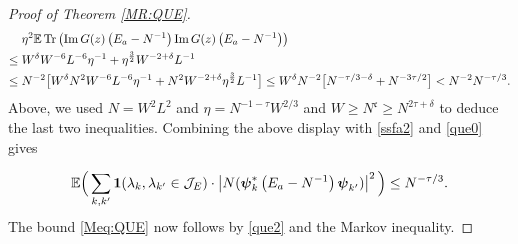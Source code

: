 \begin{proof}[Proof of Theorem \ref{MR:QUE}]
{\begin{align*}
    \;& \eta^2 \mathbb{E}  \operatorname{Tr} \left(\operatorname{Im} G(z)\left(E_a-N^{-1}\right) \operatorname{Im} G(z)\left(E_a-N^{-1}\right)\right)
 \\
 \le \;&   W^{\delta}W^{-6}L^{-6}\eta^{-1}+{\eta^{\frac32}W^{-2+\delta}}L^{-1}\\\nonumber
\le \;&    N^{-2} \big [ W^{\delta}{N^{2}W^{-6}L^{-6}\eta^{-1}}  +  {N^{2}W^{-2+\delta}\eta^{\frac32}L^{-1}}  \big ] \leq   W^{\delta} N^{-2} \big [ N^{-\tau/3-\delta}  + N^{-3\tau/2}  \big ] 
<   N^{-2}  N^{-\tau/3}.
\end{align*}
Above, we used $N=W^{2}L^{2}$ and $\eta=N^{-1-\tau}W^{2/3}$ and $W\geq N^{\mathfrak{c}}\geq N^{2\tau+\delta}$ to deduce the last two inequalities. Combining the above display with \eqref{ssfa2} and \eqref{que0} gives

\begin{align}\label{que2}
 \mathbb{E}\Big(\sum_{k,k'} \textbf{1}(\lambda_{k},\lambda_{k'}\in {\cal J}_E)\cdot \left|N(\boldsymbol{\psi}_{k}^*\left(E_a-N^{-1}\right) \boldsymbol{\psi}_{k'})\right|^2\Big)
 \le N^{-\tau/3}.
\end{align}
The bound \eqref{Meq:QUE} now follows by \eqref{que2} and the Markov inequality.

}
\end{proof}
